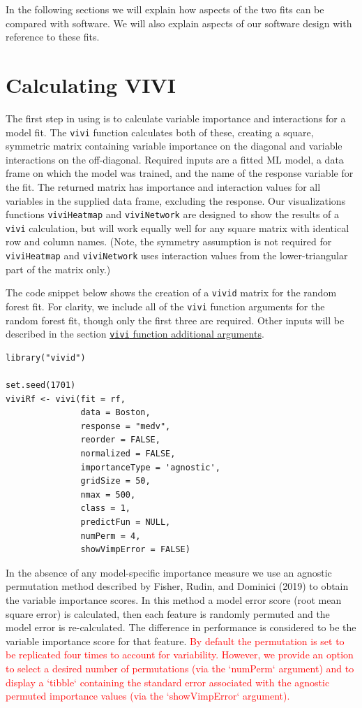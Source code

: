 In the following sections we will explain how aspects of the two fits can be compared with  software. We will also explain aspects of our software design with reference to these fits.

\hypertarget{data}{%
\section{Calculating VIVI}\label{data}}

The first step in using  is to calculate variable importance and interactions for a model fit.
The \texttt{vivi} function calculates both of these, creating a square, symmetric matrix containing variable importance on the diagonal and variable interactions on the off-diagonal. Required inputs are a fitted ML model, a data frame on which the model was trained, and the name of the response variable for the fit. The returned matrix has importance and interaction values for all variables in the supplied data frame, excluding the response. Our visualizations functions \texttt{viviHeatmap} and \texttt{viviNetwork} are designed to show the results of a \texttt{vivi} calculation, but will work equally well for any square matrix with identical row and column names. (Note, the symmetry assumption is not required for \texttt{viviHeatmap} and \texttt{viviNetwork} uses interaction values from the lower-triangular part of the matrix only.)

The code snippet below shows the creation of a \texttt{vivid} matrix for the random forest fit. For clarity, we include all of the \texttt{vivi} function arguments for the random forest fit, though only the first three are required. Other inputs will be described in the section \protect\hyperlink{sec:vivimatarg}{\texttt{vivi} function additional arguments}.

\begin{verbatim}
library("vivid")

set.seed(1701)
viviRf <- vivi(fit = rf,
               data = Boston,
               response = "medv",
               reorder = FALSE,
               normalized = FALSE,
               importanceType = 'agnostic',
               gridSize = 50,
               nmax = 500,
               class = 1,
               predictFun = NULL,
               numPerm = 4,
               showVimpError = FALSE)
\end{verbatim}

In the absence of any model-specific importance measure we use an agnostic permutation method described by Fisher, Rudin, and Dominici (2019) to obtain the variable importance scores. In this method a model error score (root mean square error) is calculated, then each feature is randomly permuted and the model error is re-calculated. The difference in performance is considered to be the variable importance score for that feature. \textcolor{red}{By default the permutation is set to be replicated four times to account for variability. However, we provide an option to select a desired number of permutations (via the `numPerm` argument) and to display a `tibble` containing the standard error associated with the agnostic permuted importance values (via the `showVimpError` argument).}

